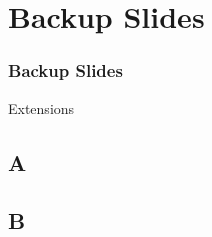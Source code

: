 % 

\section{Backup Slides}
\begin{frame}\frametitle{Backup Slides}
    Extensions
\end{frame}

\subsection{A}

\subsection{B}
%
\endinput  %
